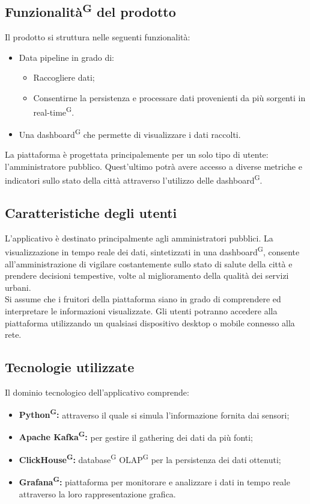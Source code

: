 \documentclass[8pt]{article}
\newcommand{\glossterm}[1]{#1\textsuperscript{G}} %
\begin{document}
\subsection{\glossterm{Funzionalità} del prodotto}
Il prodotto si struttura nelle seguenti funzionalità:
\begin{itemize}
	\setlength\itemsep{0em}
  \item Data pipeline in grado di:
  \begin{itemize}  
  \item Raccogliere dati; 
	\item Consentirne la persistenza e processare dati provenienti da più sorgenti in \glossterm{real-time}.
  \end{itemize}  
	\item Una \glossterm{dashboard} che permette di visualizzare i dati raccolti.
\end{itemize}
La piattaforma è progettata principalemente per un solo tipo di utente: l'amministratore pubblico. Quest'ultimo potrà avere accesso a diverse metriche e indicatori sullo stato della città attraverso l'utilizzo delle \glossterm{dashboard}.
\subsection{Caratteristiche degli utenti} \label{sec:users}
L'applicativo è destinato principalmente agli amministratori pubblici. La visualizzazione in tempo reale dei dati, sintetizzati in una \glossterm{dashboard}, consente all'amministrazione di vigilare costantemente sullo stato di salute della città e prendere decisioni tempestive, volte al miglioramento della qualità dei servizi urbani. \\ Si assume che i fruitori della piattaforma siano in grado di comprendere ed interpretare le informazioni visualizzate. Gli utenti potranno accedere alla piattaforma utilizzando un qualsiasi dispositivo desktop o mobile connesso alla rete.
\subsection{Tecnologie utilizzate}
Il dominio tecnologico dell'applicativo comprende:
\begin{itemize}
	\setlength\itemsep{0em}
  \item \textbf{\glossterm{Python}: }attraverso il quale si simula l'informazione fornita dai sensori;
  \item \textbf{\glossterm{Apache Kafka}:} per gestire il gathering dei dati da più fonti;
  \item \textbf{\glossterm{ClickHouse}:} \glossterm{database} \glossterm{OLAP} per la persistenza dei dati ottenuti;
  \item \textbf{\glossterm{Grafana}:} piattaforma per monitorare e analizzare i dati in tempo reale attraverso la loro rappresentazione grafica.
\end{itemize}
\end{document}
